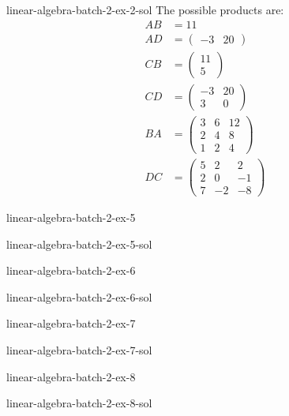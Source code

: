 \documentclass[preview]{standalone}
\begin{document}
\begin{snippetsolution}{linear-algebra-batch-2-ex-2-sol}{}
    The possible products are:
    \begin{align*}
        AB &= 11 \\
        AD &= \begin{pmatrix}-3 & 20\end{pmatrix} \\
        CB &= \begin{pmatrix}11 \\ 5\end{pmatrix} \\
        CD &= \begin{pmatrix}-3 & 20 \\ 3 & 0\end{pmatrix} \\
        BA &= \begin{pmatrix}3 & 6 & 12 \\ 2 & 4 & 8 \\ 1 & 2 & 4\end{pmatrix} \\
        DC &= \begin{pmatrix}5 & 2 & 2 \\ 2 & 0 & -1 \\ 7 & -2 & -8\end{pmatrix}
    \end{align*}
\end{snippetsolution}

\begin{snippetexercise}{linear-algebra-batch-2-ex-5}{}
    \todo
\end{snippetexercise}

\begin{snippetsolution}{linear-algebra-batch-2-ex-5-sol}{}
    \todo
\end{snippetsolution}

\begin{snippetexercise}{linear-algebra-batch-2-ex-6}{}
    \todo
\end{snippetexercise}

\begin{snippetsolution}{linear-algebra-batch-2-ex-6-sol}{}
    \todo
\end{snippetsolution}

\begin{snippetexercise}{linear-algebra-batch-2-ex-7}{}
    \todo
\end{snippetexercise}

\begin{snippetsolution}{linear-algebra-batch-2-ex-7-sol}{}
    \todo
\end{snippetsolution}

\begin{snippetexercise}{linear-algebra-batch-2-ex-8}{}
    \todo
\end{snippetexercise}

\begin{snippetsolution}{linear-algebra-batch-2-ex-8-sol}{}
    \todo
\end{snippetsolution}
\end{document}
